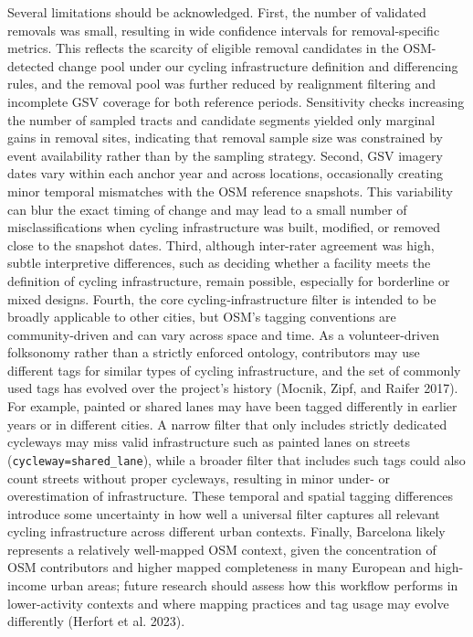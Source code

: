\documentclass[
]{article}
\begin{document}
Several limitations should be acknowledged. First, the number of
validated removals was small, resulting in wide confidence intervals for
removal-specific metrics. This reflects the scarcity of eligible removal
candidates in the OSM-detected change pool under our cycling
infrastructure definition and differencing rules, and the removal pool
was further reduced by realignment filtering and incomplete GSV coverage
for both reference periods. Sensitivity checks increasing the number of
sampled tracts and candidate segments yielded only marginal gains in
removal sites, indicating that removal sample size was constrained by
event availability rather than by the sampling strategy. Second, GSV
imagery dates vary within each anchor year and across locations,
occasionally creating minor temporal mismatches with the OSM reference
snapshots. This variability can blur the exact timing of change and may
lead to a small number of misclassifications when cycling infrastructure
was built, modified, or removed close to the snapshot dates. Third,
although inter-rater agreement was high, subtle interpretive
differences, such as deciding whether a facility meets the definition of
cycling infrastructure, remain possible, especially for borderline or
mixed designs. Fourth, the core cycling‑infrastructure filter is
intended to be broadly applicable to other cities, but OSM's tagging
conventions are community‑driven and can vary across space and time. As
a volunteer-driven folksonomy rather than a strictly enforced ontology,
contributors may use different tags for similar types of cycling
infrastructure, and the set of commonly used tags has evolved over the
project's history (Mocnik, Zipf, and Raifer 2017). For example, painted
or shared lanes may have been tagged differently in earlier years or in
different cities. A narrow filter that only includes strictly dedicated
cycleways may miss valid infrastructure such as painted lanes on streets
(\texttt{cycleway=shared\_lane}), while a broader filter that includes
such tags could also count streets without proper cycleways, resulting
in minor under- or overestimation of infrastructure. These temporal and
spatial tagging differences introduce some uncertainty in how well a
universal filter captures all relevant cycling infrastructure across
different urban contexts. Finally, Barcelona likely represents a
relatively well-mapped OSM context, given the concentration of OSM
contributors and higher mapped completeness in many European and
high-income urban areas; future research should assess how this workflow
performs in lower-activity contexts and where mapping practices and tag
usage may evolve differently (Herfort et al. 2023).
\end{document}
